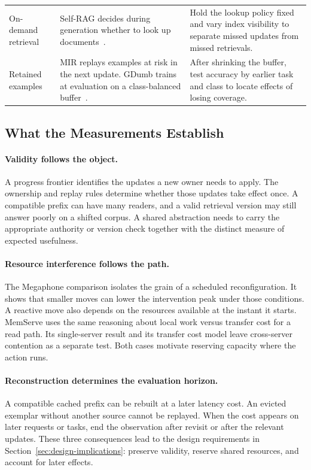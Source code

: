 \documentclass[manuscript]{acmart}
\begin{document}
\begin{table}[t]
\begin{tabular}{@{}p{}p{}p{}@{}}
On-demand retrieval & Self-RAG decides during generation whether to look up documents~\cite{asai2024selfrag}. & Hold the lookup policy fixed and vary index visibility to separate missed updates from missed retrievals. \\
Retained examples & MIR replays examples at risk in the next update. GDumb trains at evaluation on a class-balanced buffer~\cite{aljundi2019mir,prabhu2020gdumb}. & After shrinking the buffer, test accuracy by earlier task and class to locate effects of losing coverage. \\
\bottomrule
\end{tabular}
\end{table}

\subsection{What the Measurements Establish}

\paragraph{Validity follows the object.}
A progress frontier identifies the updates a new owner needs to apply. The ownership and replay rules determine whether those updates take effect once. A compatible prefix can have many readers, and a valid retrieval version may still answer poorly on a shifted corpus. A shared abstraction needs to carry the appropriate authority or version check together with the distinct measure of expected usefulness.

\paragraph{Resource interference follows the path.}
The Megaphone comparison isolates the grain of a scheduled reconfiguration. It shows that smaller moves can lower the intervention peak under those conditions. A reactive move also depends on the resources available at the instant it starts. MemServe uses the same reasoning about local work versus transfer cost for a read path. Its single-server result and its transfer cost model leave cross-server contention as a separate test. Both cases motivate reserving capacity where the action runs.

\paragraph{Reconstruction determines the evaluation horizon.}
A compatible cached prefix can be rebuilt at a later latency cost. An evicted exemplar without another source cannot be replayed. When the cost appears on later requests or tasks, end the observation after revisit or after the relevant updates. These three consequences lead to the design requirements in Section~\ref{sec:design-implications}: preserve validity, reserve shared resources, and account for later effects.
\end{document}
